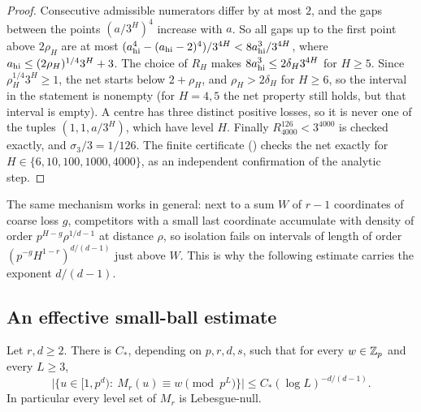 \documentclass[11pt]{article}
\begin{document}
\begin{proof}
Consecutive admissible numerators differ by at most $2$, and the gaps between the points $(a/3^H)^4$
increase with $a$. So all gaps up to the first point above $2\rho_H$ are at most
$(a_{\rm hi}^4-(a_{\rm hi}-2)^4)/3^{4H}<8a_{\rm hi}^3/3^{4H}$, where $a_{\rm hi}\le(2\rho_H)^{1/4}3^H+3$. The choice
of $R_H$ makes $8a_{\rm hi}^3\le2\delta_H3^{4H}$ for $H\ge5$. Since $\rho_H^{1/4}3^H\ge1$, the net starts below
$2+\rho_H$, and $\rho_H>2\delta_H$ for $H\ge6$, so the interval in the statement is nonempty (for $H=4,5$ the net
property still holds, but that interval is empty). A centre has three distinct positive losses,
so it is never one of the tuples $(1,1,a/3^H)$, which have level $H$. Finally $R_{4000}^{126}<3^{4000}$ is
checked exactly, and $\sigma_3/3=1/126$. The finite certificate () checks the net exactly for
$H\in\{6,10,100,1000,4000\}$, as an independent confirmation of the analytic step.
\end{proof}

The same mechanism works in general: next to a sum $W$ of $r-1$ coordinates of coarse loss $g$,
competitors with a small last coordinate accumulate with density of order $p^{H-g}\rho^{1/d-1}$ at
distance $\rho$, so isolation fails on intervals of length of order $(p^{-g}H^{1-r})^{d/(d-1)}$ just
above $W$. This is why the following estimate carries the exponent $d/(d-1)$.

\subsection{An effective small-ball estimate}\label{sec:smallball}

\begin{theorem}\label{thm:smallball}
Let $r,d\ge2$. There is $C_*$, depending on $p,r,d,s$, such that for every $w\in\mathbb Z_p$ and every $L\ge3$,
\[
\bigl|\{u\in[1,p^d):\ M_r(u)\equiv w\pmod{p^L}\}\bigr|\le C_*(\log L)^{-d/(d-1)}.
\]
In particular every level set of $M_r$ is Lebesgue-null.
\end{theorem}
\end{document}
